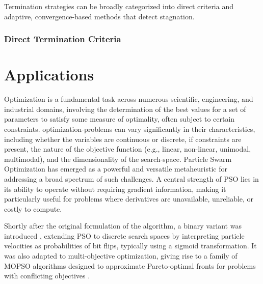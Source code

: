 {Termination strategies can be broadly categorized into direct criteria and adaptive, convergence-based methods that detect stagnation.

\subsubsection{Direct Termination Criteria}







\section{Applications}

Optimization is a fundamental task across numerous scientific, engineering, and industrial domains, involving the determination of the best values for a set of parameters to satisfy some measure of optimality, often subject to certain constraints. \Glspl{optimization-problem}  can vary significantly in their characteristics, including whether the variables are continuous or discrete, if constraints are present, the nature of the objective function (e.g., linear, non-linear, unimodal, multimodal), and the dimensionality of the \gls{search-space}.
Particle Swarm Optimization has emerged as a powerful and versatile metaheuristic for addressing a broad spectrum of such challenges. A central strength of PSO lies in its ability to operate without requiring gradient information, making it particularly useful for problems where derivatives are unavailable, unreliable, or costly to compute.

Shortly after the original formulation of the algorithm, a binary variant was introduced \citep{kennedy1997discrete}, extending PSO to discrete search spaces by interpreting particle velocities as probabilities of bit flips, typically using a sigmoid transformation. 
It was also adapted to multi-objective optimization, giving rise to a family of MOPSO algorithms designed to approximate Pareto-optimal fronts for problems with conflicting objectives \citep{alvarezbenitez2005mopso, nebro2009smpsomcdm, shao2025improved}.


}
